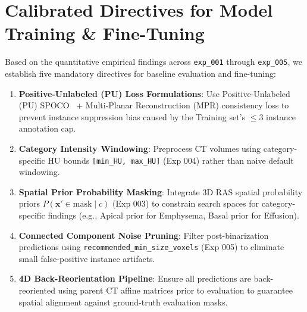 \documentclass[11pt,a4paper]{article}
\begin{document}
\section{Calibrated Directives for Model Training \& Fine-Tuning}

Based on the quantitative empirical findings across \texttt{exp\_001} through \texttt{exp\_005}, we establish five mandatory directives for baseline evaluation and fine-tuning:

\begin{enumerate}
    \item \textbf{Positive-Unlabeled (PU) Loss Formulations}: Use Positive-Unlabeled (PU) SPOCO~\cite{wolny2022spoco} + Multi-Planar Reconstruction (MPR) consistency loss to prevent instance suppression bias caused by the Training set's $\le 3$ instance annotation cap.
    \item \textbf{Category Intensity Windowing}: Preprocess CT volumes using category-specific HU bounds \texttt{[min\_HU, max\_HU]} (Exp 004) rather than naive default windowing.
    \item \textbf{Spatial Prior Probability Masking}: Integrate 3D RAS spatial probability priors $P(\mathbf{x}' \in \text{mask} \mid c)$ (Exp 003) to constrain search spaces for category-specific findings (e.g., Apical prior for Emphysema, Basal prior for Effusion).
    \item \textbf{Connected Component Noise Pruning}: Filter post-binarization predictions using \texttt{recommended\_min\_size\_voxels} (Exp 005) to eliminate small false-positive instance artifacts.
    \item \textbf{4D Back-Reorientation Pipeline}: Ensure all predictions are back-reoriented using parent CT affine matrices prior to evaluation to guarantee spatial alignment against ground-truth evaluation masks.
\end{enumerate}
\end{document}
